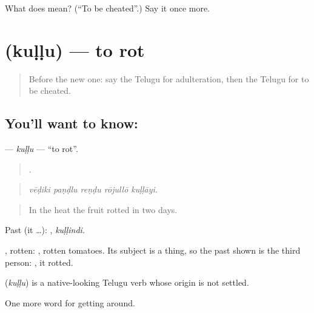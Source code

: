 \begin{tcolorbox}[breakable,colback=teal!4,colframe=teal!35!black,title={Before you move on}]
What does  mean? (\textquotedblleft{}To be cheated\textquotedblright{}.) Say it once more.
\end{tcolorbox}
\section[\texorpdfstring{\te{కుళ్ళు} (kuḷḷu)}{కుళ్ళు (kuḷḷu)}]{ (kuḷḷu) — to rot}

\label{lesson:TE-C489-kullu}



\begin{quote}
Before the new one: say the Telugu for adulteration, then the Telugu for to be cheated.
\end{quote}

\subsection*{You'll want to know: }
\textbf{} — \emph{kuḷḷu} — \textquotedblleft{}to rot\textquotedblright{}.

\begin{quote}
    .
\end{quote}

\begin{quote}
\emph{vēḍiki paṇḍlu reṇḍu rōjullō kuḷḷāyi.}
\end{quote}

\begin{quote}
In the heat the fruit rotted in two days.
\end{quote}

Past (it …): , \emph{kuḷḷindi}.

, rotten:  , rotten tomatoes. Its subject is a thing, so the past shown is the third person: , it rotted.

\begin{cousinweb}
\textbf{} (\emph{kuḷḷu}) is a native-looking Telugu verb whose origin is not settled.
\end{cousinweb}

\begin{grammarlens}[title={What you've built}]
One more word for getting around.
\end{grammarlens}


